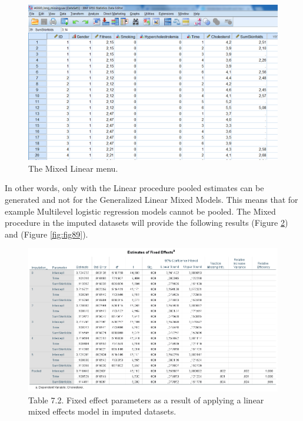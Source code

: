 \documentclass[]{book}
\begin{document}
\begin{figure}

{\centering \includegraphics[width=0.9\linewidth]{images/fig7.15} 

}

\caption{The Mixed Linear menu.}\label{fig:fig87}
\end{figure}

In other words, only with the Linear procedure pooled estimates can be
generated and not for the Generalized Linear Mixed Models. This means
that for example Multilevel logistic regression models cannot be pooled.
The Mixed procedure in the imputed datasets will provide the following
results (Figure \ref{fig:fig88}) and (Figure \ref{fig:fig89}).

\begin{figure}

{\centering \includegraphics[width=0.9\linewidth]{images/table7.2} 

}

\caption{Table 7.2. Fixed effect parameters as a result of applying a linear mixed effects model in imputed datasets.}\label{fig:fig88}
\end{figure}
\end{document}
